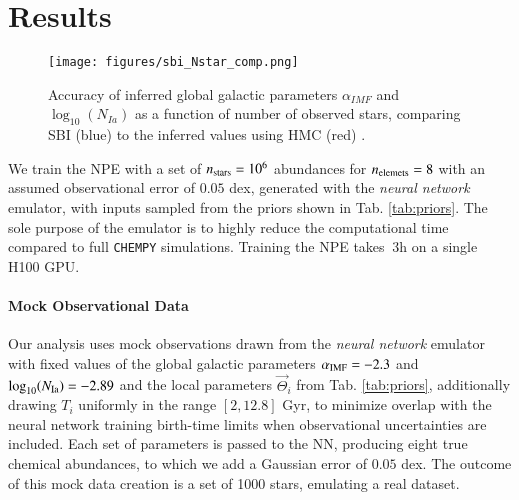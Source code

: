 \documentclass{aa}
\begin{document}






\section{Results}
\label{sec: Results}

\begin{figure}[ht]
    \centering
    \texttt{[image: figures/sbi\_Nstar\_comp.png]}
    \vspace{-.25cm}
    \caption{Accuracy of inferred global galactic parameters $\alpha_{IMF}$ and $\log_{10}(N_{Ia})$ as a function of number of observed stars, comparing SBI (blue) to the inferred values using HMC (red) \cite{Philcox_2019} .}
    \label{fig:N_star_analysis}
\end{figure}

We train the NPE with a set of $n_{\rm stars}=10^6$ abundances for $n_{\rm elemets}=8$ with an assumed observational error of $0.05$ dex, generated with the \textit{neural network} emulator, with inputs sampled from the priors shown in Tab. \ref{tab:priors}. The sole purpose of the emulator is to highly reduce the computational time compared to full \texttt{CHEMPY} simulations. Training the NPE takes $~3$h on a single H100 GPU.

\paragraph{Mock Observational Data}
Our analysis uses mock observations drawn from the \textit{neural network} emulator with fixed values of the global galactic parameters $\alpha_{\rm IMF}=-2.3$ and $\log_{10}(N_{\rm Ia})=-2.89$ and the local parameters $\vec{\Theta}_i$ from Tab. \ref{tab:priors}, additionally drawing $T_i$ uniformly in the range $[2,12.8]$ Gyr, to minimize overlap with the neural network training birth-time limits when observational uncertainties are included. 
Each set of parameters is passed to the NN, producing eight true chemical abundances, to which we add a Gaussian error of $0.05$ dex.
The outcome of this mock data creation is a set of 1000 stars, emulating a real dataset.
\end{document}
